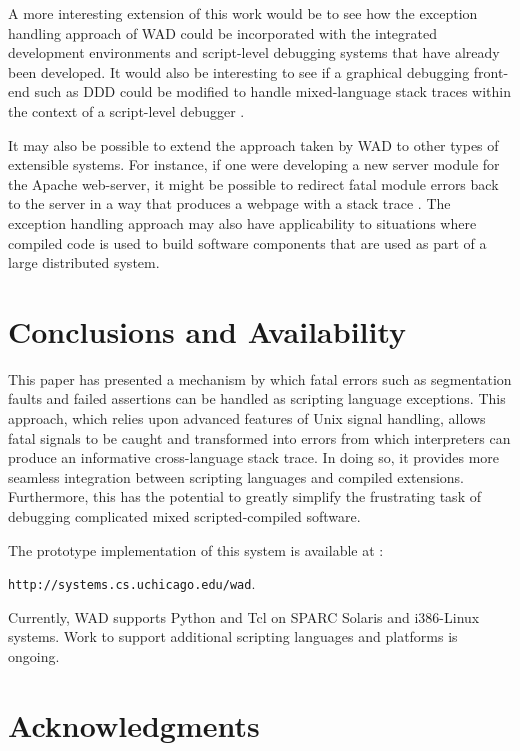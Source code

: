A more interesting extension of this work would be to see how the
exception handling approach of WAD could be incorporated with
the integrated development environments and script-level debugging
systems that have already been developed.  It would also be interesting
to see if a graphical debugging front-end such as DDD could be modified
to handle mixed-language stack traces within the context of a script-level debugger \cite{ddd}.   

It may also be possible to extend the approach taken by WAD to other
types of extensible systems.  For instance, if one were developing a
new server module for the Apache web-server, it might be possible to redirect fatal
module errors back to the server in a way that produces a webpage with
a stack trace \cite{apache}.  The exception handling approach may also have
applicability to situations where compiled code is used to build software
components that are used as part of a large distributed system.

\section{Conclusions and Availability}

This paper has presented a mechanism by which fatal errors such as
segmentation faults and failed assertions can be handled as scripting
language exceptions.  This approach, which relies upon advanced
features of Unix signal handling, allows fatal signals to be caught
and transformed into errors from which interpreters can produce an
informative cross-language stack trace. In doing so, it provides more
seamless integration between scripting languages and compiled
extensions.  Furthermore, this has the potential to greatly simplify the
frustrating task of debugging complicated mixed scripted-compiled
software.

The prototype implementation of this system is available at :

\begin{center}
{\tt http://systems.cs.uchicago.edu/wad}.
\end{center}

\noindent
Currently, WAD supports Python and Tcl on SPARC Solaris and i386-Linux
systems.  Work to support additional scripting languages and platforms
is ongoing.

\section{Acknowledgments}

